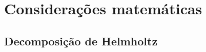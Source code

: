 \chapter{Considerações matemáticas}  \label{app:apendice-consideracoes-matematicas}

\section{Decomposição de Helmholtz}
